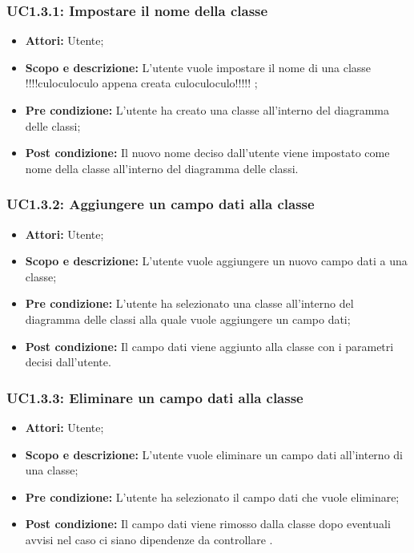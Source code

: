\documentclass[../AnalisiDeiRequisiti.tex]{subfiles}
\begin{document}
	\subsubsection{UC1.3.1: Impostare il nome della classe}
	\begin{itemize}
		\item \textbf{Attori:} Utente;
		\item \textbf{Scopo e descrizione: }L'utente vuole impostare il nome di una classe  !!!!culoculoculo  appena creata culoculoculo!!!!!  ;
		\item \textbf{Pre condizione: }L'utente ha creato una classe all'interno del diagramma delle classi;
		\item \textbf{Post condizione: }Il nuovo nome deciso dall'utente viene impostato come nome della classe all'interno del diagramma delle classi.
	\end{itemize}
	
	\subsubsection{UC1.3.2: Aggiungere un campo dati alla classe}
	\begin{itemize}
		\item \textbf{Attori:} Utente;
		\item \textbf{Scopo e descrizione: }L'utente vuole aggiungere un nuovo campo dati a una classe;
		\item \textbf{Pre condizione: }L'utente ha selezionato una classe all'interno del diagramma delle classi alla quale vuole aggiungere un campo dati;
		\item \textbf{Post condizione: }Il campo dati viene aggiunto alla classe con i parametri decisi dall'utente.
	\end{itemize}
	
	\subsubsection{UC1.3.3: Eliminare un campo dati alla classe}
	\begin{itemize}
		\item \textbf{Attori:} Utente;
		\item \textbf{Scopo e descrizione: }L'utente vuole eliminare un campo dati all'interno di una classe;
		\item \textbf{Pre condizione: }L'utente ha selezionato il campo dati che vuole eliminare;
		\item \textbf{Post condizione: }Il campo dati viene rimosso dalla classe dopo eventuali avvisi nel caso ci siano dipendenze da controllare .
	\end{itemize}
	
\end{document}
